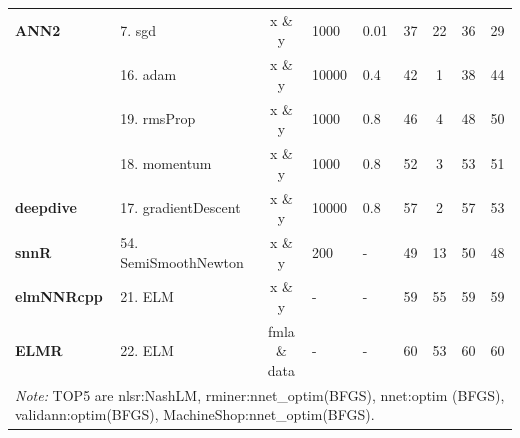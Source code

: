 \begin{Schunk}
\begin{table}[!h]
\begin{tabular}[t]{>{}llcllcccc}
\multirow{-3}{*}{\raggedright\arraybackslash \textbf{ANN2}} & 7. sgd & x \& y & 1000 & 0.01 & 37 & 22 & 36 & 29\\
\cmidrule{1-9}
 & 16. adam & x \& y & 10000 & 0.4 & 42 & 1 & 38 & 44\\

 & 19. rmsProp & x \& y & 1000 & 0.8 & 46 & 4 & 48 & 50\\

 & 18. momentum & x \& y & 1000 & 0.8 & 52 & 3 & 53 & 51\\

\multirow{-4}{*}{\raggedright\arraybackslash \textbf{deepdive}} & 17. gradientDescent & x \& y & 10000 & 0.8 & 57 & 2 & 57 & 53\\
\cmidrule{1-9}
\textbf{snnR} & 54. SemiSmoothNewton & x \& y & 200 & - & 49 & 13 & 50 & 48\\
\cmidrule{1-9}
\textbf{elmNNRcpp} & 21. ELM & x \& y & - & - & 59 & 55 & 59 & 59\\
\cmidrule{1-9}
\textbf{ELMR} & 22. ELM & fmla \& data & - & - & 60 & 53 & 60 & 60\\
\bottomrule
\multicolumn{9}{l}{\rule{0pt}{1em}\textit{Note: } TOP5 are nlsr:NashLM, rminer:nnet\_optim(BFGS), nnet:optim (BFGS), validann:optim(BFGS), MachineShop:nnet\_optim(BFGS).}\\
\end{tabular}
\end{table}

\end{Schunk}

